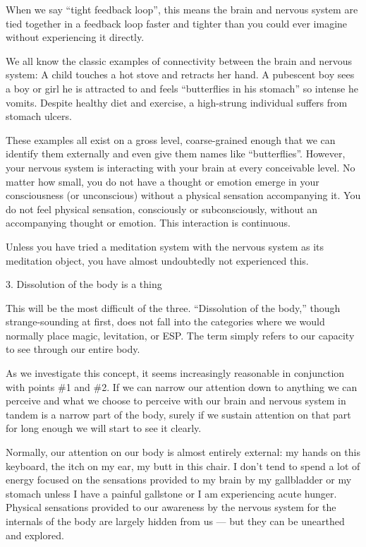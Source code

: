 \documentclass{article}
\begin{document}
When we say “tight feedback loop”, this means the brain and nervous system are tied together in a feedback loop faster and tighter than you could ever imagine without experiencing it directly.

We all know the classic examples of connectivity between the brain and nervous system: A child touches a hot stove and retracts her hand. A pubescent boy sees a boy or girl he is attracted to and feels ``butterflies in his stomach'' so intense he vomits. Despite healthy diet and exercise, a high-strung individual suffers from stomach ulcers.

These examples all exist on a gross level, coarse-grained enough that we can identify them externally and even give them names like ``butterflies''. However, your nervous system is interacting with your brain at every conceivable level. No matter how small, you do not have a thought or emotion emerge in your consciousness (or unconscious) without a physical sensation accompanying it. You do not feel physical sensation, consciously or subconsciously, without an accompanying thought or emotion. This interaction is continuous.

Unless you have tried a meditation system with the nervous system as its meditation object, you have almost undoubtedly not experienced this.

3. Dissolution of the body
is a thing

This will be the most difficult of the three. ``Dissolution of the body,'' though strange-sounding at first, does not fall into the categories where we would normally place magic, levitation, or ESP. The term simply refers to our capacity to see through our entire body.

As we investigate this concept, it seems increasingly reasonable in conjunction with points \#1 and \#2. If we can narrow our attention down to anything we can perceive and what we choose to perceive with our brain and nervous system in tandem is a narrow part of the body, surely if we sustain attention on that part for long enough we will start to see it clearly.

Normally, our attention on our body is almost entirely external: my hands on this keyboard, the itch on my ear, my butt in this chair. I don't tend to spend a lot of energy focused on the sensations provided to my brain by my gallbladder or my stomach unless I have a painful gallstone or I am experiencing acute hunger. Physical sensations provided to our awareness by the nervous system for the internals of the body are largely hidden from us — but they can be unearthed and explored.
\end{document}
